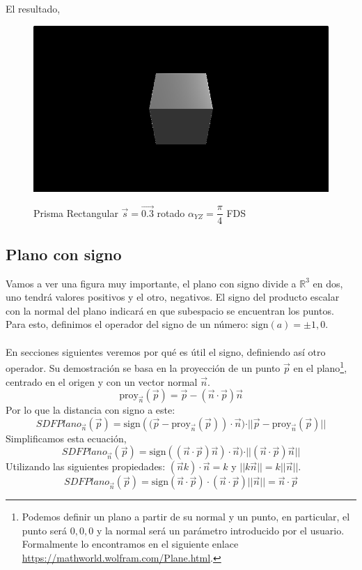 El resultado,
\begin{figure}[H]
  \centering
  \captionsetup{justification=centering}%
  \includegraphics[width=1.0\textwidth]{secciones/imagenes/sdf/3d/sdf_prisma_rect.png}\label{fig:prisma}
  \caption{Prisma Rectangular \(\Vec{s}=\Vec{0.3}\) rotado \(\alpha_{YZ}=\dfrac{\pi}{4}\) FDS}
\end{figure}

\subsection{Plano con signo}
Vamos a ver una figura muy importante, el plano con signo divide a \(\mathbb{R}^3\) en dos, uno tendrá valores positivos y el otro, negativos. El signo del producto escalar con la normal del plano indicará en que subespacio se encuentran los puntos. Para esto, definimos el operador del signo de un número:  \(\text{sign}(a)=\pm 1, 0\).\\\\
En secciones siguientes veremos por qué es útil el signo, definiendo así otro operador. Su demostración se basa en la proyección de un punto \(\Vec{p}\) en el plano\footnote{Podemos definir un plano a partir de su normal y un punto, en particular, el punto será \(0,0,0\) y la normal será un parámetro introducido por el usuario. Formalmente lo encontramos en el siguiente enlace \url{https://mathworld.wolfram.com/Plane.html}.}, centrado en el origen y con un vector normal \(\Vec{n}\).
\[\text{proy}_{\Vec{n}}(\Vec{p}) = \Vec{p} - (\Vec{n}\cdot\Vec{p})\Vec{n} \]
Por lo que la distancia con signo a este:
\[ SDFPlano_{\Vec{n}}(\Vec{p})=\text{sign}\left((\Vec{p}-\text{proy}_{\Vec{n}}(\Vec{p})\right) \cdot \Vec{n})\cdot \vert \vert \Vec{p} - \text{proy}_{\Vec{n}}(\Vec{p}) \vert\vert \]
Simplificamos esta ecuación,
\[ SDFPlano_{\Vec{n}}(\Vec{p}) = \text{sign}\left((\Vec{n}\cdot\Vec{p})\Vec{n}\right) \cdot \Vec{n})\cdot \vert \vert (\Vec{n}\cdot\Vec{p})\Vec{n}  \vert\vert \]
Utilizando las siguientes propiedades: \((\Vec{n}k)\cdot\Vec{n}=k\) y \(\vert\vert k\Vec{n}\vert\vert=k\vert\vert\Vec{n}\vert\vert\).
\[ SDFPlano_{\Vec{n}}(\Vec{p})=\text{sign}\left(\Vec{n}\cdot\Vec{p}\right)\cdot (\Vec{n}\cdot\Vec{p}) \vert \vert\Vec{n}\vert\vert=\Vec{n}\cdot\Vec{p}\]

